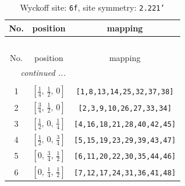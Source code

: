 \documentclass[fleqn,8pt]{jsarticle}
\begin{document}
\begin{longtable}{ccc}
\caption{Wyckoff site: {\tt 6f}, site symmetry: {\tt 2.221'}}
 \\
 \hline \hline
No. & position & mapping \\ \hline \endfirsthead

\multicolumn{2}{l}{\tablename\ \thetable{}} \\
 \hline \hline
No. & position & mapping \\ \hline \endhead

 \hline \hline
\multicolumn{2}{r}{\footnotesize\it continued ...} \\ \endfoot

 \hline \hline
\multicolumn{2}{r}{} \\ \endlastfoot

1 & $\left[ \frac{1}{4},\, \frac{1}{2},\, 0 \right]$ & {\tt [1,8,13,14,25,32,37,38]} \\ \hline
2 & $\left[ \frac{3}{4},\, \frac{1}{2},\, 0 \right]$ & {\tt [2,3,9,10,26,27,33,34]} \\ \hline
3 & $\left[ \frac{1}{2},\, 0,\, \frac{1}{4} \right]$ & {\tt [4,16,18,21,28,40,42,45]} \\ \hline
4 & $\left[ \frac{1}{2},\, 0,\, \frac{3}{4} \right]$ & {\tt [5,15,19,23,29,39,43,47]} \\ \hline
5 & $\left[ 0,\, \frac{3}{4},\, \frac{1}{2} \right]$ & {\tt [6,11,20,22,30,35,44,46]} \\ \hline
6 & $\left[ 0,\, \frac{1}{4},\, \frac{1}{2} \right]$ & {\tt [7,12,17,24,31,36,41,48]} \\
\end{longtable}
\renewcommand{\arraystretch}{1.2}
\end{document}
